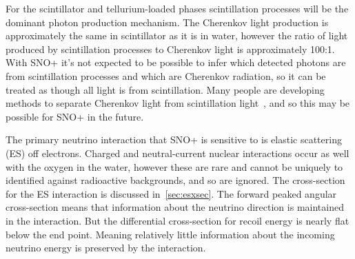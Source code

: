For the scintillator and tellurium-loaded phases scintillation processes will be
the dominant photon production mechanism.
The Cherenkov light production is approximately the same in scintillator as it is in
water, however the ratio of light produced by scintillation processes to Cherenkov
light is approximately 100:1.
With SNO+ it's not expected to be possible to infer which detected photons are
from scintillation processes and which are Cherenkov radiation, so it can be treated
as though all light is from scintillation.
Many people are developing methods to separate Cherenkov light from scintillation
light~\citep{tanners_paper, javi_chess, winslow_directionality},
and so this may be possible for SNO+ in the future.

The primary neutrino interaction that SNO+ is sensitive to is elastic scattering (ES)
off electrons.
Charged and neutral-current nuclear interactions occur as well with the oxygen in the water,
however these are rare and cannot be uniquely to identified against radioactive
backgrounds, and so are ignored.
The cross-section for the ES interaction is discussed in~\ref{sec:esxsec}.
The forward peaked angular cross-section means that information about the
neutrino direction is maintained in the interaction.
But the differential cross-section for recoil energy is nearly flat below the
end point. Meaning relatively little information about the incoming neutrino energy
is preserved by the interaction.






